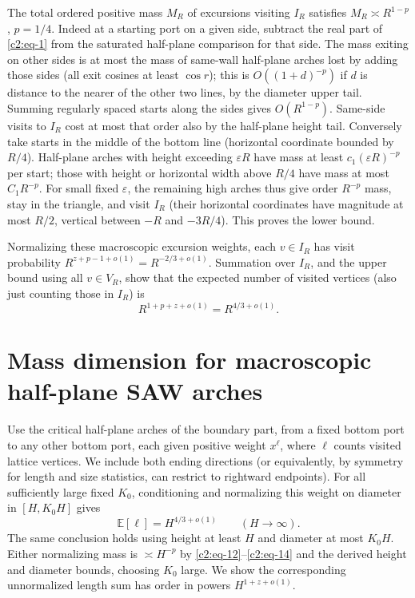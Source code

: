 The total ordered positive mass \(M_R\) of excursions visiting \(I_R\) satisfies \(M_R\asymp R^{1-p}\), \(p=1/4\). Indeed at a starting port on a given side, subtract the real part of \eqref{c2:eq-1} from the saturated half-plane comparison for that side. The mass exiting on other sides is at most the mass of same-wall half-plane arches lost by adding those sides (all exit cosines at least \(\cos r\)); this is \(O((1+d)^{-p})\) if \(d\) is distance to the nearer of the other two lines, by the diameter upper tail. Summing regularly spaced starts along the sides gives \(O(R^{1-p})\). Same-side visits to \(I_R\) cost at most that order also by the half-plane height tail. Conversely take starts in the middle of the bottom line (horizontal coordinate bounded by \(R/4\)). Half-plane arches with height exceeding \(\varepsilon R\) have mass at least \(c_1(\varepsilon R)^{-p}\) per start; those with height or horizontal width above \(R/4\) have mass at most \(C_1 R^{-p}\). For small fixed \(\varepsilon\), the remaining high arches thus give order \(R^{-p}\) mass, stay in the triangle, and visit \(I_R\) (their horizontal coordinates have magnitude at most \(R/2\), vertical between \(-R\) and \(-3R/4\)). This proves the lower bound.

Normalizing these macroscopic excursion weights, each \(v\in I_R\) has visit probability \(R^{z+p-1+o(1)}=R^{-2/3+o(1)}\). Summation over \(I_R\), and the upper bound using all \(v\in V_R\), show that the expected number of visited vertices (also just counting those in \(I_R\)) is
\begin{equation}
 R^{1+p+z+o(1)}=R^{4/3+o(1)}.                                             \label{c2:eq-G4}
\end{equation}

\section{Mass dimension for macroscopic half-plane SAW arches}\label{c2:arches}

Use the critical half-plane arches of the boundary part, from a fixed bottom port to any other bottom port, each given positive weight \(x^\ell\), where \(\ell\) counts visited lattice vertices. We include both ending directions (or equivalently, by symmetry for length and size statistics, can restrict to rightward endpoints). For all sufficiently large fixed \(K_0\), conditioning and normalizing this weight on diameter in \([H,K_0H]\) gives
\begin{equation}
 \mathbb E[\ell]=H^{4/3+o(1)}\qquad(H\to\infty).                         \label{c2:eq-H1}
\end{equation}
The same conclusion holds using height at least \(H\) and diameter at most \(K_0H\). Either normalizing mass is \(\asymp H^{-p}\) by \eqref{c2:eq-12}--\eqref{c2:eq-14} and the derived height and diameter bounds, choosing \(K_0\) large. We show the corresponding unnormalized length sum has order in powers \(H^{1+z+o(1)}\).


